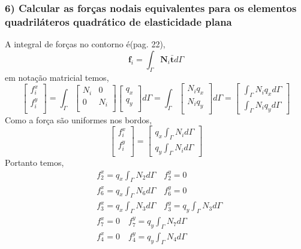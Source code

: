 \subsubsection{6) Calcular as forças nodais equivalentes para os elementos quadriláteros quadrático de elasticidade plana}

A integral de forças no contorno é(pag. 22),
%
\begin{equation}
	\mathbf{f}_i = \int_{\Gamma} \mathbf{N}_i \mathbf{\bar t} d\Gamma
\end{equation}
%
em notação matricial temos,
%
\begin{equation}
	\begin{bmatrix}
		f^x_i\\
		f^y_i\\
	\end{bmatrix}
	=
	\int_{\Gamma}
	\begin{bmatrix}
		N_i&0\\
		0&N_i\\
	\end{bmatrix}
	\begin{bmatrix}
		q_x\\
		q_y\\
	\end{bmatrix}
	d\Gamma
	=
	\int_{\Gamma}
	\begin{bmatrix}
		N_i q_x\\
		N_i q_y\\
	\end{bmatrix}
	d\Gamma
	=
	\begin{bmatrix}
		\int_{\Gamma} N_i q_x d\Gamma\\
		\int_{\Gamma} N_i q_y d\Gamma
	\end{bmatrix}
\end{equation}
%
Como a força são uniformes nos bordos,
%
\begin{equation}
	\begin{bmatrix}
		f^x_i\\
		f^y_i\\
	\end{bmatrix}
	=
	\begin{bmatrix}
		q_x \int_{\Gamma} N_i d\Gamma\\
		q_y \int_{\Gamma} N_i d\Gamma
	\end{bmatrix}
\end{equation}
%
Portanto temos,
%
\begin{equation}
\begin{split}
&f^x_2 = q_x \int_{\Gamma} N_2 d\Gamma \quad f^y_2 = 0\\
&f^x_6 = q_x \int_{\Gamma} N_6 d\Gamma \quad f^y_6 = 0\\
&f^x_3 = q_x \int_{\Gamma} N_3 d\Gamma \quad f^y_3 =  q_y \int_{\Gamma} N_3 d\Gamma\\
&f^x_7 = 0 \quad f^y_7 =  q_y \int_{\Gamma} N_7 d\Gamma\\
&f^x_4 = 0 \quad f^y_4 = q_y \int_{\Gamma} N_4 d\Gamma
\end{split}
\end{equation}
